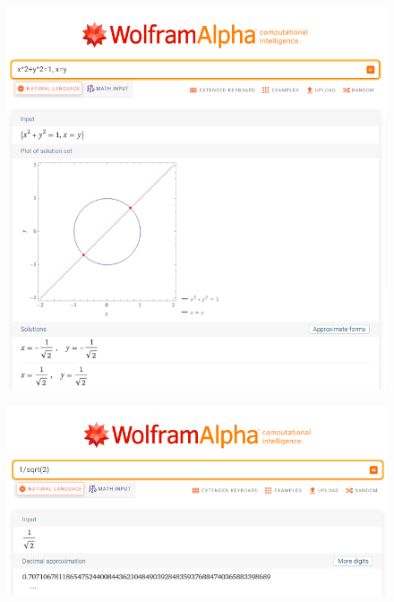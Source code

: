 \documentclass[10pt,letterpaper]{article}
\begin{document}
	\begin{figure}[H]
		\includegraphics[width=\textwidth]{imagen8}
		\centering
	\end{figure}
	\begin{figure}[H]
		\includegraphics[width=\textwidth]{imagen9}
		\centering
	\end{figure}
	
\end{document}
